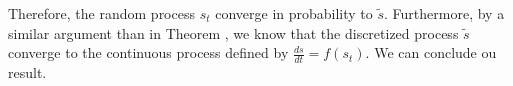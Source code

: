 Therefore, the random process $s_t$ converge in probability to $\tilde s$. Furthermore, by a similar argument than in Theorem , we know that the discretized process $\tilde s$ converge to the continuous process defined by $\frac{ds}{dt} = f(s_t)$. We can conclude ou result.


